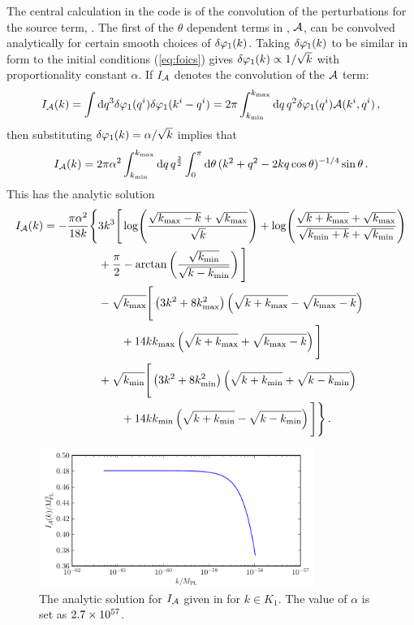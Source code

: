 The central calculation in the code is of the
convolution of the perturbations for the source term,
. The first of the $\theta$ dependent terms in
, $\mathcal{A}$,
can be convolved analytically for certain smooth choices of $\delta\varphi_{1}(k)$. 
Taking $\delta\varphi_{1}(k)$ to be similar in form to the initial conditions
(\ref{eq:foics}) gives $\delta\varphi_{1}(k)\propto 1/\sqrt{k}$ with proportionality constant
$\alpha$.
If $I_{\mathcal{A}}$ denotes the convolution of the $\mathcal{A}$ term:
% 
\begin{equation}
 I_{\mathcal{A}} (k) = \int \mathrm{d} q^3 \delta\varphi_{1}(q^i) \delta\varphi_{1}(k^i-q^i) 
          = 2\pi \int_{k_{\mathrm{min}}}^{k_{\mathrm{max}}} \mathrm{d} q\, q^2 \delta\varphi_{1}(q^i) \mathcal{A}(k^i, q^i)\,,
\end{equation}
% 
then substituting $\delta\varphi_{1}(k) = \alpha/\sqrt{k}$ implies that
% 
\begin{equation}
 I_{\mathcal{A}}(k) = 2\pi\alpha^2 \int_{k_{\mathrm{min}}}^{k_{\mathrm{max}}} \mathrm{d} q\, q^{\frac{3}{2}}
\int_{0}^{\pi} \mathrm{d}\theta\, (k^2 + q^2 -2k q \cos{\theta})^{-1/4} \sin{\theta}\,. 
\end{equation}
% 
This has the analytic solution
% 
\begin{align}
\label{eq:err-analytic-num}
 I_\A(k) = -\frac{\pi\alpha^2}{18 k}\Bigg\{ 
	&3 k^3 \Bigg[ \log\Biggl(\frac{\sqrt{\kmax-k} + \sqrt{\kmax}}{\sqrt{k}}
			    \Biggr)
	 + \log\Biggl( \frac{\sqrt{k+\kmax} +\sqrt{\kmax}}{\sqrt{\kmin+k} +
		      \sqrt{\kmin}}\Biggr) \nonumber \\
	&+\frac{\pi}{2} - \arctan\left( \frac{\sqrt{\kmin}}{\sqrt{k-\kmin}}\right)
	\Bigg] \nonumber\\
% 
        &-\sqrt{\kmax}\Bigg[ \left(3k^2 + 8\kmax^2 \right)\left(\sqrt{k+\kmax} -
	  \sqrt{\kmax-k}\right) \nonumber \\
	&\qquad + 14k\kmax\left(\sqrt{k+\kmax}+\sqrt{\kmax-k}\right)\Bigg]\nonumber\\
% 
	&+\sqrt{\kmin}\Bigg[ \left(3k^2 + 8\kmin^2 \right)\left(\sqrt{k+\kmin} +
	  \sqrt{k-\kmin}\right) \nonumber \\
	&\qquad +14k\kmin \left(\sqrt{k+\kmin} -
         \sqrt{k-\kmin} \right) \Bigg] \Bigg\} \,.
\end{align}
% 
\begin{figure}[tb]
 \centering
 \includegraphics[width=0.8\textwidth]
    {./numerical/graphs/errors_analytic_aterm-half.pdf}
 \caption{The analytic solution for $I_{\mathcal{A}}$ given in  for
$k\in K_1$. The value of $\alpha$ is set as $2.7\times 10^{57}$.}
 \label{fig:inta-num}
\end{figure}
